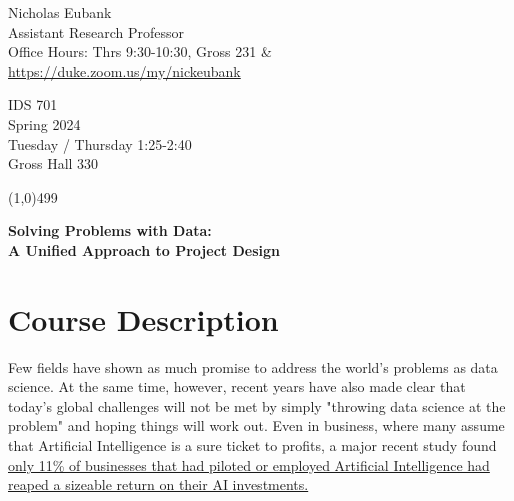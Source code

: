 \documentclass[12pt]{article}
\begin{document}
\singlespacing






\thispagestyle{empty}
\begin{minipage}[t]{.5\textwidth}
	Nicholas Eubank \\
	 Assistant Research Professor\\
	 Office Hours: Thrs 9:30-10:30, Gross 231 \& \\
	 \url{https://duke.zoom.us/my/nickeubank}
     \vspace*{0.1cm}
\end{minipage}
\begin{minipage}[t]{.5\textwidth}
	\begin{flushright}  IDS 701 \\
	Spring 2024 \\
	Tuesday / Thursday 1:25-2:40 \\
	Gross Hall 330
\end{flushright}
\end{minipage}


\line(1,0){499}

\vspace{.35in}

\begin{center}
	\textbf{\LARGE{Solving Problems with Data: \\ A Unified Approach to Project Design} }
\end{center}



\section{Course Description}

Few fields have shown as much promise to address the world's problems as data science. At the same time, however, recent years have also made clear that today's global challenges will not be met by simply "throwing data science at the problem" and hoping things will work out. Even in business, where many assume that Artificial Intelligence is a sure ticket to profits, a major recent study found \href{https://www.wired.com/story/companies-rushing-use-ai-few-see-payoff/}{only 11\% of businesses that had piloted or employed Artificial Intelligence had reaped a sizeable return on their AI investments.}
\end{document}
